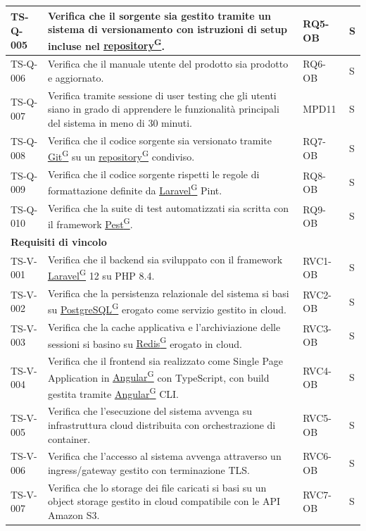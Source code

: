 \documentclass[a4paper,12pt]{article}
\providecommand{\glslink}[2]{\href{https://alittlebyte-19.github.io/Documentazione/glossario.html\#gls-#1}{\underline{#2}\textsuperscript{\scriptsize G}}}
\begin{document}
\begin{longtable}{|p{2.2cm}|p{9.5cm}|p{2.3cm}|p{1.5cm}|}
    \hline
    TS-Q-005 & Verifica che il sorgente sia gestito tramite un sistema di versionamento con istruzioni di setup incluse nel \glslink{repository}{repository}. & RQ5-OB & S \\
    \hline
    TS-Q-006 & Verifica che il manuale utente del prodotto sia prodotto e aggiornato. & RQ6-OB & S \\
    \hline
    TS-Q-007 & Verifica tramite sessione di user testing che gli utenti siano in grado di apprendere le funzionalità principali del sistema in meno di 30 minuti. & MPD11 & S \\
    \hline
    TS-Q-008 & Verifica che il codice sorgente sia versionato tramite \glslink{git}{Git} su un \glslink{repository}{repository} condiviso. & RQ7-OB & S \\
    \hline
    TS-Q-009 & Verifica che il codice sorgente rispetti le regole di formattazione definite da \glslink{laravel}{Laravel} Pint. & RQ8-OB & S \\
    \hline
    TS-Q-010 & Verifica che la suite di test automatizzati sia scritta con il framework \glslink{pest}{Pest}. & RQ9-OB & S \\
    \hline
   \multicolumn{4}{|l|}{\cellcolor{gray!12}\textbf{Requisiti di vincolo}} \\
    \hline
    TS-V-001 & Verifica che il backend sia sviluppato con il framework \glslink{laravel}{Laravel} 12 su PHP 8.4. & RVC1-OB & S \\
    \hline
    TS-V-002 & Verifica che la persistenza relazionale del sistema si basi su \glslink{postgresql}{PostgreSQL} erogato come servizio gestito in cloud. & RVC2-OB & S \\
    \hline
    TS-V-003 & Verifica che la cache applicativa e l'archiviazione delle sessioni si basino su \glslink{redis}{Redis} erogato in cloud. & RVC3-OB & S \\
    \hline
    TS-V-004 & Verifica che il frontend sia realizzato come Single Page Application in \glslink{angular}{Angular} con TypeScript, con build gestita tramite \glslink{angular}{Angular} CLI. & RVC4-OB & S \\
    \hline
    TS-V-005 & Verifica che l'esecuzione del sistema avvenga su infrastruttura cloud distribuita con orchestrazione di container. & RVC5-OB & S \\
    \hline
    TS-V-006 & Verifica che l'accesso al sistema avvenga attraverso un ingress/gateway gestito con terminazione TLS. & RVC6-OB & S \\
    \hline
    TS-V-007 & Verifica che lo storage dei file caricati si basi su un object storage gestito in cloud compatibile con le API Amazon S3. & RVC7-OB & S \\

\end{longtable}
\end{document}
